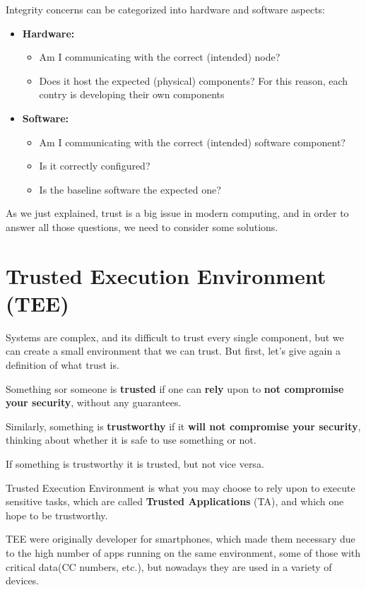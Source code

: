 Integrity concerns can be categorized into hardware and 
software aspects:

\begin{itemize}
  \item \textbf{Hardware:}
    \begin{itemize}
      \item Am I communicating with the correct (intended) node?
      \item Does it host the expected (physical) components? For this
        reason, each contry is developing their own components
    \end{itemize}
  \item \textbf{Software:}
    \begin{itemize}
      \item Am I communicating with the correct (intended) 
        software component?
      \item Is it correctly configured?
      \item Is the baseline software the expected one?
    \end{itemize}
\end{itemize}

As we just explained, trust is a big issue in modern computing, and 
in order to answer all those questions, we need to consider some
solutions.
\section{Trusted Execution Environment (TEE)}
Systems are complex, and its difficult to trust every single
component, but we can create a small environment that we can trust.
But first, let's give again a definition of what trust is.
\begin{boxH}
  Something sor someone is \textbf{trusted} if one can \textbf{rely}
  upon to \textbf{not compromise your security}, without any
  guarantees.
\end{boxH}

Similarly, something is \textbf{trustworthy} if it \textbf{will not
compromise your security}, thinking about whether it is safe to use
something or not.

If something is trustworthy it is trusted, but not vice versa.

Trusted Execution Environment is what you may choose to rely upon to
execute sensitive tasks, which are called \textbf{Trusted
Applications} (TA), and which one hope to be trustworthy. 

TEE were originally developer for smartphones, which made them
necessary due to the high number of apps running on the same
environment, some of those with critical data(CC numbers, etc.), but
nowadays they are used in a variety of devices.

